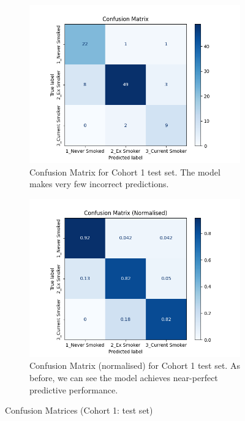 \documentclass{article}
\begin{document}
\begin{figure}[H]
    \centering
    \begin{subfigure}{0.75\textwidth}
        \centering
        \includegraphics[width=\linewidth]{cohort1_cm.png}
        \caption{Confusion Matrix for Cohort 1 test set. The model makes very few incorrect predictions.}
    \end{subfigure}
    \begin{subfigure}{0.75\textwidth}
        \centering
        \includegraphics[width=\linewidth]{cohort1_cm_n.png}
        \caption{Confusion Matrix (normalised) for Cohort 1 test set. As before, we can see the model achieves near-perfect predictive performance.}
    \end{subfigure}
    \caption{Confusion Matrices (Cohort 1: test set)}
    \label{fig:cohort1-cm}
\end{figure}

\printbibliography
\end{document}
